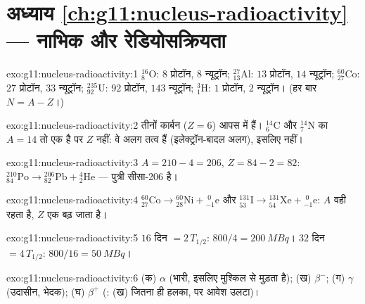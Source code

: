 \section*{अध्याय \ref{ch:g11:nucleus-radioactivity} --- नाभिक और रेडियोसक्रियता}

\begin{solution}{exo:g11:nucleus-radioactivity:1}
${}^{16}_{8}\mathrm{O}$: $8$ प्रोटॉन, $8$ न्यूट्रॉन; ${}^{27}_{13}\mathrm{Al}$: $13$ प्रोटॉन, $14$ न्यूट्रॉन;
${}^{60}_{27}\mathrm{Co}$: $27$ प्रोटॉन, $33$ न्यूट्रॉन; ${}^{235}_{92}\mathrm{U}$: $92$ प्रोटॉन, $143$
न्यूट्रॉन; ${}^{3}_{1}\mathrm{H}$: $1$ प्रोटॉन, $2$ न्यूट्रॉन। (हर बार $N = A - Z$।)
\end{solution}

\begin{solution}{exo:g11:nucleus-radioactivity:2}
तीनों कार्बन ($Z = 6$) आपस में  हैं। ${}^{14}_{6}\mathrm{C}$ और ${}^{14}_{7}\mathrm{N}$ का
$A = 14$ तो एक है पर $Z$ नहीं: वे अलग तत्व हैं (इलेक्ट्रॉन-बादल अलग), इसलिए
 नहीं।
\end{solution}

\begin{solution}{exo:g11:nucleus-radioactivity:3}
$A = 210 - 4 = 206$, $Z = 84 - 2 = 82$: ${}^{210}_{84}\mathrm{Po} \to {}^{206}_{82}\mathrm{Pb} +
{}^{4}_{2}\mathrm{He}$ --- पुत्री सीसा-206 है।
\end{solution}

\begin{solution}{exo:g11:nucleus-radioactivity:4}
${}^{60}_{27}\mathrm{Co} \to {}^{60}_{28}\mathrm{Ni} +
{}^{\;0}_{-1}\mathrm{e}$ और ${}^{131}_{53}\mathrm{I} \to {}^{131}_{54}\mathrm{Xe} +
{}^{\;0}_{-1}\mathrm{e}$: $A$ वही रहता है, $Z$ एक बढ़ जाता है।
\end{solution}

\begin{solution}{exo:g11:nucleus-radioactivity:5}
$16$ दिन $= 2\,T_{1/2}$: $800/4 = \qty{200}{MBq}$। $32$ दिन $= 4\,T_{1/2}$: $800/16 = \qty{50}{MBq}$।
\end{solution}

\begin{solution}{exo:g11:nucleus-radioactivity:6}
(क) $\alpha$ (भारी, इसलिए मुश्किल से मुड़ता है); (ख) $\beta^-$; (ग) $\gamma$
(उदासीन, भेदक); (घ) $\beta^+$ (: (ख) जितना ही हलका, पर आवेश
उलटा)।
\end{solution}

